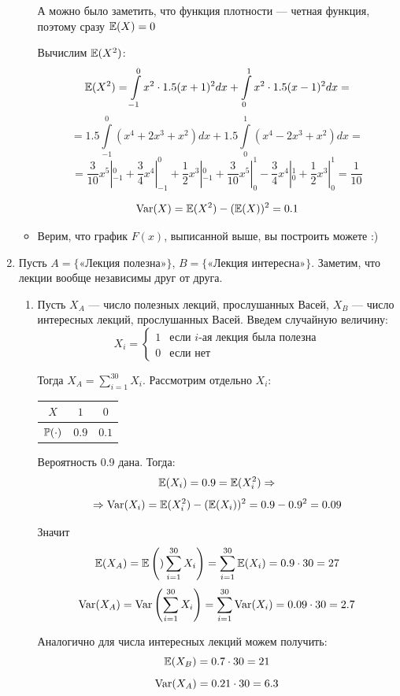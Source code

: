 \documentclass[12pt, a4paper]{article}\usepackage[]{graphicx}\usepackage[]{color}
\begin{document}
\begin{enumerate}
\begin{itemize}
А можно было заметить, что функция плотности — четная функция, поэтому сразу $\E(X) = 0$

Вычислим $\E(X^2)$:
\[\E(X^2) = \int \limits_{-1}^0 x^2 \cdot 1.5 (x + 1)^2 dx +  \int \limits_0^1 x^2 \cdot 1.5 (x - 1)^2 dx = \]
\[= 1.5 \int \limits_{-1}^0\left( x^4 + 2x^3 + x^2\right) dx + 1.5 \int \limits_0^1\left( x^4 -2x^3 + x^2\right) dx = \]
\[=  \frac{3}{10} x^5 |_{-1}^0 + \frac{3}{4} x^4|_{-1}^0 + \frac{1}{2} x^3 |_{-1}^0 +  \frac{3}{10} x^5 |_0^1 - \frac{3}{4} x^4|_0^1  + \frac{1}{2} x^3 |_0^1 =  \frac{1}{10}\]

\[\Var(X) = \E(X^2) - (\E(X))^2 = 0.1\]

\item Верим, что график $F(x)$, выписанной выше, вы построить можете :)
\end{itemize}
\item
Пусть $A = \{\text{«Лекция полезна»}\}$, $B = \{\text{«Лекция интересна»}\}$. Заметим, что лекции вообще независимы друг от друга.

\begin{enumerate}
\item Пусть $X_A$ — число полезных лекций, прослушанных Васей,  $X_B$ — число интересных лекций, прослушанных Васей. Введем случайную величину:
\[X_i =
\begin{cases}
1 & \text{если } i\text{-ая лекция была полезна}\\
0 & \text{если нет}
\end{cases}
\]

Тогда $X_A = \sum\limits_{i=1}^{30}X_i$. Рассмотрим отдельно $X_i$:

\begin{tabular}{@{}ccc@{}}
\toprule
$X$         & $1$             & $0$               \\ \midrule
$\P(\cdot)$ & $0.9$ & $0.1$ \\ \bottomrule
\end{tabular}

Вероятность 0.9 дана. Тогда:
\[
\E(X_i) = 0.9 = \E(X^2_i) \Rightarrow
\]
\[
\Rightarrow \Var(X_i) = \E(X^2_i) - (\E(X_i))^2 = 0.9 - 0.9^2 = 0.09
\]

Значит
\[
\E(X_A) = \E\left()\sum\limits_{i=1}^{30}X_i\right) = \sum\limits_{i=1}^{30}\E(X_i)  = 0.9\cdot30 = 27
\]
\[
\Var(X_A) = \Var\left(\sum\limits_{i=1}^{30}X_i\right) = \sum\limits_{i=1}^{30}\Var(X_i) = 0.09\cdot30 = 2.7
\]

Аналогично для числа интересных лекций можем получить:
\[
\E(X_B) = 0.7\cdot 30 = 21
\]
\[
\Var(X_A) = 0.21\cdot 30 = 6.3
\]



\end{enumerate}
\end{enumerate}
\end{document}
